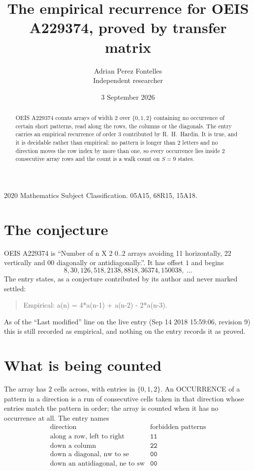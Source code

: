 \documentclass[11pt,a4paper]{article}
\title{The empirical recurrence for OEIS A229374, proved by transfer matrix}
\author{Adrian Perez Fontelles\\ \small Independent researcher}
\date{3 September 2026}
\theoremstyle{plain}
\theoremstyle{definition}
\begin{document}
\maketitle

\begin{abstract}
OEIS A229374 counts arrays of width $2$ over $\{0,1,2\}$ containing no occurrence of certain short
patterns, read along the rows, the columns or the diagonals. The entry carries an empirical
recurrence of order $3$ contributed by R.~H.~Hardin. It is true, and it is decidable
rather than empirical: no pattern is longer than $2$ letters and no direction moves the row
index by more than one, so every occurrence lies inside $2$ consecutive array rows and the
count is a walk count on $S=9$ states.
\end{abstract}

\noindent\small 2020 Mathematics Subject Classification. 05A15, 68R15, 15A18.\normalsize

\section{The conjecture}

OEIS A229374 is ``Number of n X 2 0..2 arrays avoiding 11 horizontally, 22 vertically and 00 diagonally or antidiagonally.''. It has offset $1$ and begins
\[
8, 30, 126, 518, 2138, 8818, 36374, 150038,\ \dots
\]
The entry states, as a conjecture contributed by its author and never marked settled:
\begin{quote}
Empirical: a(n) = 4*a(n-1) + a(n-2) - 2*a(n-3).
\end{quote}
As of the ``Last modified'' line on the live entry (Sep 14 2018 15:59:06, revision 9) this is still
recorded as empirical, and nothing on the entry records it as proved.

\section{What is being counted}

The array has $2$ cells across, with entries in $\{0,1,2\}$. An OCCURRENCE of a pattern in a
direction is a run of consecutive cells taken in that direction whose entries match the pattern
in order; the array is counted when it has no occurrence at all. The entry names
\[
\begin{array}{ll}
\text{direction} & \text{forbidden patterns} \\[2pt]
\text{along a row, left to right} & \mathtt{11} \\
\text{down a column} & \mathtt{22} \\
\text{down a diagonal, nw to se} & \mathtt{00} \\
\text{down an antidiagonal, ne to sw} & \mathtt{00} \\
\end{array}
\]
\end{document}
